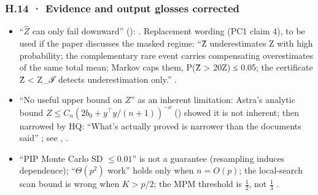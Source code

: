 \subsubsection*{H.14 · Evidence and output glosses corrected}
\begin{itemize}[leftmargin=1.3em]
\item ``$\hat Z$ can only fail downward'' ():  . Replacement wording (PC1 claim 4), to be used if the paper discusses the masked regime: ``Ẑ underestimates Z with high probability; the complementary rare event carries compensating overestimates of the same total mean; Markov caps them, P(Ẑ > 20Z) ≤ 0.05; the certificate Ẑ < Z\_𝒯 detects underestimation only.'' .
\item ``No useful upper bound on $Z$'' as an inherent limitation: Astra's analytic bound $Z\le C_n(2b_0+y^\top y/(n+1))^{-\nu}$ () showed it is not inherent; then narrowed by HQ: ``What's actually proved is narrower than the documents said'' ; see ,  .
\item ``PIP Monte Carlo SD $\le 0.01$'' is not a guarantee (resampling induces dependence); ``$\Theta(p^2)$ work'' holds only when $n=O(p)$; the local-search scan bound is wrong when $K>p/2$; the MPM threshold is $\tfrac12$, not $\tfrac13$ .
\end{itemize}

